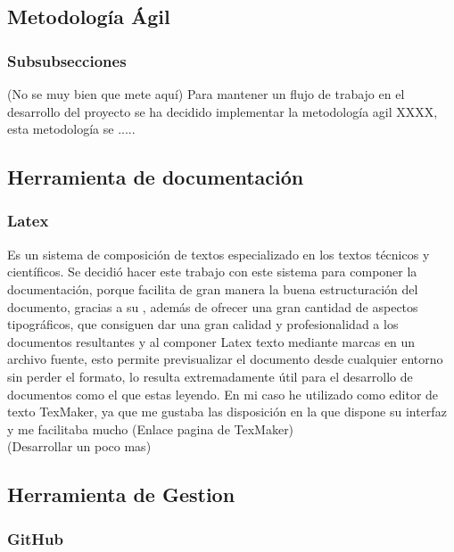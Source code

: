 
\subsection{Metodología Ágil}

\subsubsection{Subsubsecciones}

(No se muy bien que mete aquí)
Para mantener un flujo de trabajo en el desarrollo del proyecto se ha decidido implementar la metodología agil XXXX, esta metodología se .....



\subsection{Herramienta de documentación}

\subsubsection{Latex}

Es un sistema de composición de textos especializado en los textos técnicos y científicos.
Se decidió hacer este trabajo con este sistema para componer la documentación, porque facilita de gran manera la buena estructuración del documento, gracias a su , además de ofrecer una gran cantidad de aspectos tipográficos, que consiguen dar una gran calidad y profesionalidad a los documentos resultantes y al componer Latex texto mediante marcas en un archivo fuente, esto permite previsualizar el documento desde cualquier entorno sin perder el formato, lo resulta extremadamente útil para el desarrollo de documentos como el que estas leyendo.
En mi caso he utilizado como editor de texto TexMaker, ya que me gustaba las disposición en la que dispone su interfaz y me facilitaba mucho (Enlace pagina de TexMaker)\\

(Desarrollar  un poco mas)

\subsection{Herramienta de Gestion }

\subsubsection{GitHub}

